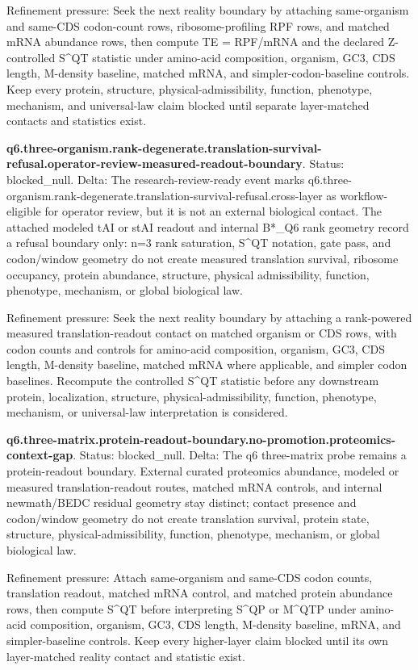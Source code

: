 Refinement pressure: Seek the next reality boundary by attaching same-organism and same-CDS codon-count rows, ribosome-profiling RPF rows, and matched mRNA abundance rows, then compute TE = RPF/mRNA and the declared Z-controlled S\textasciicircum{}QT statistic under amino-acid composition, organism, GC3, CDS length, M-density baseline, matched mRNA, and simpler-codon-baseline controls. Keep every protein, structure, physical-admissibility, function, phenotype, mechanism, and universal-law claim blocked until separate layer-matched contacts and statistics exist.

\textbf{q6.three-organism.rank-degenerate.translation-survival-refusal.operator-review-measured-readout-boundary}. Status: blocked\_null. Delta: The research-review-ready event marks q6.three-organism.rank-degenerate.translation-survival-refusal.cross-layer as workflow-eligible for operator review, but it is not an external biological contact. The attached modeled tAI or stAI readout and internal B*\_Q6 rank geometry record a refusal boundary only: n=3 rank saturation, S\textasciicircum{}QT notation, gate pass, and codon/window geometry do not create measured translation survival, ribosome occupancy, protein abundance, structure, physical admissibility, function, phenotype, mechanism, or global biological law.

Refinement pressure: Seek the next reality boundary by attaching a rank-powered measured translation-readout contact on matched organism or CDS rows, with codon counts and controls for amino-acid composition, organism, GC3, CDS length, M-density baseline, matched mRNA where applicable, and simpler codon baselines. Recompute the controlled S\textasciicircum{}QT statistic before any downstream protein, localization, structure, physical-admissibility, function, phenotype, mechanism, or universal-law interpretation is considered.

\textbf{q6.three-matrix.protein-readout-boundary.no-promotion.proteomics-context-gap}. Status: blocked\_null. Delta: The q6 three-matrix probe remains a protein-readout boundary. External curated proteomics abundance, modeled or measured translation-readout routes, matched mRNA controls, and internal newmath/BEDC residual geometry stay distinct; contact presence and codon/window geometry do not create translation survival, protein state, structure, physical-admissibility, function, phenotype, mechanism, or global biological law.

Refinement pressure: Attach same-organism and same-CDS codon counts, translation readout, matched mRNA control, and matched protein abundance rows, then compute S\textasciicircum{}QT before interpreting S\textasciicircum{}QP or M\textasciicircum{}QTP under amino-acid composition, organism, GC3, CDS length, M-density baseline, mRNA, and simpler-baseline controls. Keep every higher-layer claim blocked until its own layer-matched reality contact and statistic exist.

